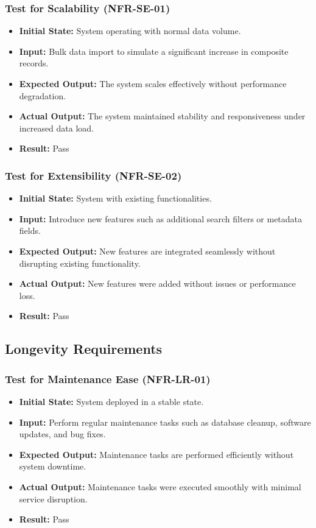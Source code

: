 \documentclass[12pt, titlepage]{article}
\begin{document}
\subsubsection{Test for Scalability (NFR-SE-01)}
\begin{itemize}
    \item \textbf{Initial State: }System operating with normal data volume.
    \item \textbf{Input: }Bulk data import to simulate a significant increase in composite records.
    \item \textbf{Expected Output: }The system scales effectively without performance degradation.
    \item \textbf{Actual Output: }The system maintained stability and responsiveness under increased data load.
    \item \textbf{Result: }Pass
\end{itemize}

\subsubsection{Test for Extensibility (NFR-SE-02)}
\begin{itemize}
    \item \textbf{Initial State: }System with existing functionalities.
    \item \textbf{Input: }Introduce new features such as additional search filters or metadata fields.
    \item \textbf{Expected Output: }New features are integrated seamlessly without disrupting existing functionality.
    \item \textbf{Actual Output: }New features were added without issues or performance loss.
    \item \textbf{Result: }Pass
\end{itemize}

\subsection{Longevity Requirements}

\subsubsection{Test for Maintenance Ease (NFR-LR-01)}
\begin{itemize}
    \item \textbf{Initial State: }System deployed in a stable state.
    \item \textbf{Input: }Perform regular maintenance tasks such as database cleanup, software updates, and bug fixes.
    \item \textbf{Expected Output: }Maintenance tasks are performed efficiently without system downtime.
    \item \textbf{Actual Output: }Maintenance tasks were executed smoothly with minimal service disruption.
    \item \textbf{Result: }Pass
\end{itemize}
\end{document}
